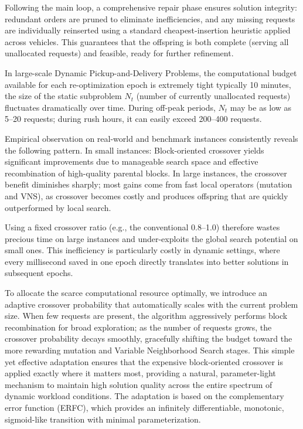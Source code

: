 \documentclass[preprint,12pt]{elsarticle}
\begin{document}
Following the main loop, a comprehensive repair phase ensures solution integrity: redundant orders are pruned to eliminate inefficiencies, and any missing requests are individually reinserted using a standard cheapest-insertion heuristic applied across vehicles. This guarantees that the offspring is both complete (serving all unallocated requests) and feasible, ready for further refinement.

In large-scale Dynamic Pickup-and-Delivery Problems, the computational budget available for each re-optimization epoch is extremely tight typically 10 minutes, the size of the static subproblem \(N_t\) (number of currently unallocated requests) fluctuates dramatically over time. During off-peak periods, \(N_t\) may be as low as 5–20 requests; during rush hours, it can easily exceed 200–400 requests.

Empirical observation on real-world and benchmark instances consistently reveals the following pattern.
In small instances: Block-oriented crossover yields significant improvements due to manageable search space and effective recombination of high-quality parental blocks. In large instances, the crossover benefit diminishes sharply; most gains come from fast local operators (mutation and VNS), as crossover becomes costly and produces offspring that are quickly outperformed by local search.

Using a fixed crossover ratio (e.g., the conventional 0.8–1.0) therefore wastes precious time on large instances and under-exploits the global search potential on small ones. This inefficiency is particularly costly in dynamic settings, where every millisecond saved in one epoch directly translates into better solutions in subsequent epochs.

To allocate the scarce computational resource optimally, we introduce an adaptive crossover probability that automatically scales with the current problem size. When few requests are present, the algorithm aggressively performs block recombination for broad exploration; as the number of requests grows, the crossover probability decays smoothly, gracefully shifting the budget toward the more rewarding mutation and Variable Neighborhood Search stages. This simple yet effective adaptation ensures that the expensive block-oriented crossover is applied exactly where it matters most, providing a natural, parameter-light mechanism to maintain high solution quality across the entire spectrum of dynamic workload conditions. The adaptation is based on the complementary error function (ERFC), which provides an infinitely differentiable, monotonic, sigmoid-like transition with minimal parameterization.
\end{document}
